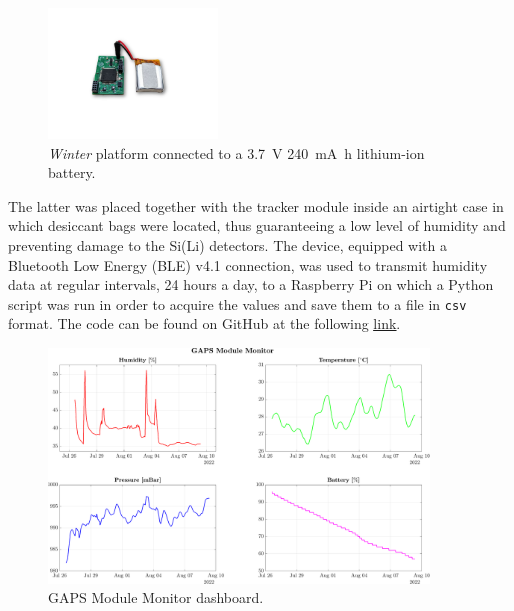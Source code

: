 \begin{figure}[h!]
    \centering
    \includegraphics[width=0.4\textwidth]{Images/chap3/winter_battery.pdf}
    \caption{\textit{Winter} platform connected to a \SI{3.7}{\volt} \SI{240}{\milli\ampere h} lithium-ion battery.}
    \label{figWinterBattery}
\end{figure}

\par
The latter was placed together with the tracker module inside an airtight case in which desiccant bags were located, thus guaranteeing a low level of humidity and preventing damage to the Si(Li) detectors. The device, equipped with a Bluetooth Low Energy (BLE) v4.1 connection, was used to transmit humidity data at regular intervals, 24 hours a day, to a Raspberry Pi on which a Python script was run in order to acquire the values and save them to a file in \texttt{csv} format. The code can be found on GitHub at the following \href{https://github.com/lucaghislo/winter_enviroment_monitor}{\underline{link}}. 

\begin{figure}[h!]
    \centering
    \includegraphics[width=0.9\textwidth]{Images/chap3/winter_plot.pdf} 
    \caption{GAPS Module Monitor dashboard.}
    \label{figWinterMATLABmonitor}
\end{figure}

